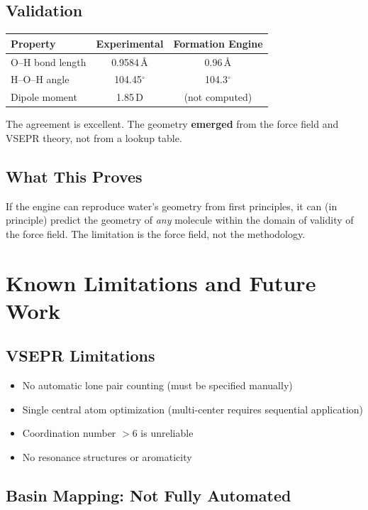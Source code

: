 \documentclass[11pt]{article}
\begin{document}
\subsection{Validation}

\begin{center}
\begin{tabular}{lcc}
\toprule
Property & Experimental & Formation Engine \\
\midrule
O--H bond length & 0.9584\,\AA & 0.96\,\AA \\
H--O--H angle & 104.45$^\circ$ & 104.3$^\circ$ \\
Dipole moment & 1.85\,D & (not computed) \\
\bottomrule
\end{tabular}
\end{center}

The agreement is excellent. The geometry \textbf{emerged} from the force field and VSEPR theory, not from a lookup table.

\subsection{What This Proves}

If the engine can reproduce water's geometry from first principles, it can (in principle) predict the geometry of \textit{any} molecule within the domain of validity of the force field. The limitation is the force field, not the methodology.

\section{Known Limitations and Future Work}

\subsection{VSEPR Limitations}

\begin{itemize}
\item No automatic lone pair counting (must be specified manually)
\item Single central atom optimization (multi-center requires sequential application)
\item Coordination number $> 6$ is unreliable
\item No resonance structures or aromaticity
\end{itemize}

\subsection{Basin Mapping: Not Fully Automated}
\end{document}
